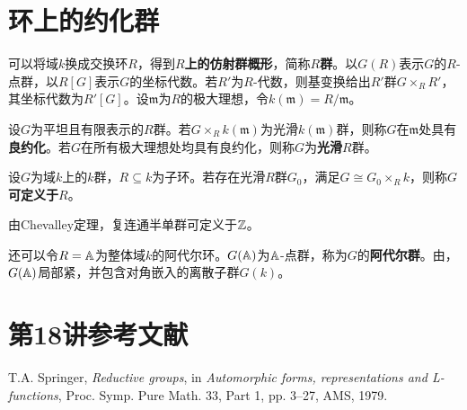 \section{环上的约化群}\label{L18S3}
可以将域$k$换成交换环$R$，得到\textbf{$R$上的仿射群概形}，简称\textbf{$R$群}。以$G(R)$表示$G$的$R$-点群，以$R[G]$表示$G$的坐标代数。若$R'$为$R$-代数，则基变换给出$R'$群$G\times_R R'$，其坐标代数为$R'[G]$。设$\mathfrak m$为$R$的极大理想，令$k(\mathfrak m)=R/\mathfrak m$。
\begin{definition}\label{L18S3O1}
设$G$为平坦且有限表示的$R$群。若$G\times_R k(\mathfrak m)$为光滑$k(\mathfrak m)$群，则称$G$在$\mathfrak m$处具有\textbf{良约化}。若$G$在所有极大理想处均具有良约化，则称$G$为\textbf{光滑}$R$群。
\end{definition}
设$G$为域$k$上的$k$群，$R\subseteq k$为子环。若存在光滑$R$群$G_0$，满足$G\cong G_0\times_R k$，则称$G$\textbf{可定义于}$R$。
\begin{note}[L18S3O2]
由Chevalley定理，复连通半单群可定义于$\mathbb{Z}$。
\end{note}
还可以令$R=\mathbb{A}$为整体域$k$的阿代尔环。$G(\mathbb{A})$为$\mathbb{A}$-点群，称为$G$的\textbf{阿代尔群}。由，$G(\mathbb{A})$局部紧，并包含对角嵌入的离散子群$G(k)$。
\section{第18讲参考文献}\label{L18S4}
\begin{references}
 T.A. Springer, \emph{Reductive groups}, in \emph{Automorphic forms, representations and L-functions}, Proc. Symp. Pure Math. 33, Part 1, pp. 3--27, AMS, 1979.
\end{references}
